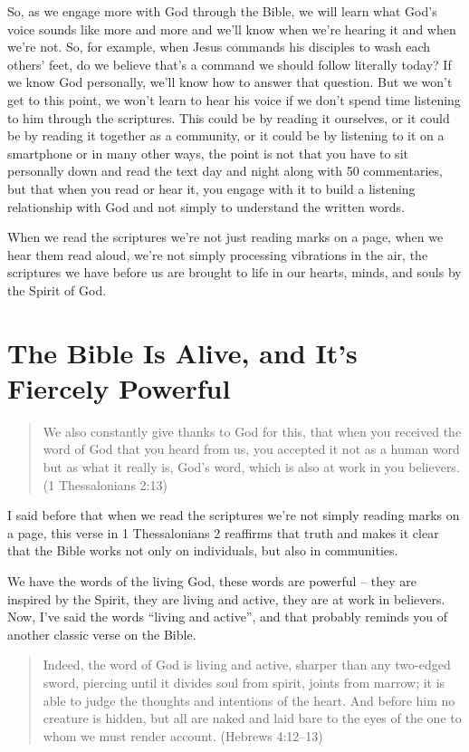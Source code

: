So, as we engage more with God through the Bible, we will learn what God's voice
sounds like more and more and we'll know when we're hearing it and when we're
not. So, for example, when Jesus commands his disciples to wash each others'
feet, do we believe that's a command we should follow literally today? If we
know God personally, we'll know how to answer that question. But we won't get to
this point, we won't learn to hear his voice if we don't spend time listening to
him through the scriptures. This could be by reading it ourselves, or it could
be by reading it together as a community, or it could be by listening to it on a
smartphone or in many other ways, the point is not that you have to sit
personally down and read the text day and night along with 50 commentaries, but
that when you read or hear it, you engage with it to build a listening
relationship with God and not simply to understand the written words.

When we read the scriptures we're not just reading marks on a page, when we hear
them read aloud, we're not simply processing vibrations in the air, the
scriptures we have before us are brought to life in our hearts, minds, and souls
by the Spirit of God.

\section{The Bible Is Alive, and It's Fiercely Powerful}

\begin{quote}
    We also constantly give thanks to God for this, that when you received the
    word of God that you heard from us, you accepted it not as a human word but
    as what it really is, God's word, which is also at work in you believers. (1
    Thessalonians 2:13)
\end{quote}

I said before that when we read the scriptures we're not simply reading marks on
a page, this verse in 1 Thessalonians 2 reaffirms that truth and makes it clear
that the Bible works not only on individuals, but also in communities.

We have the words of the living God, these words are powerful -- they are
inspired by the Spirit, they are living and active, they are at work in
believers. Now, I've said the words \enquote{living and active}, and that
probably reminds you of another classic verse on the Bible.

\begin{quote}
    Indeed, the word of God is living and active, sharper than any two-edged
    sword, piercing until it divides soul from spirit, joints from marrow; it is
    able to judge the thoughts and intentions of the heart. And before him no
    creature is hidden, but all are naked and laid bare to the eyes of the one
    to whom we must render account. (Hebrews 4:12--13)
\end{quote}

